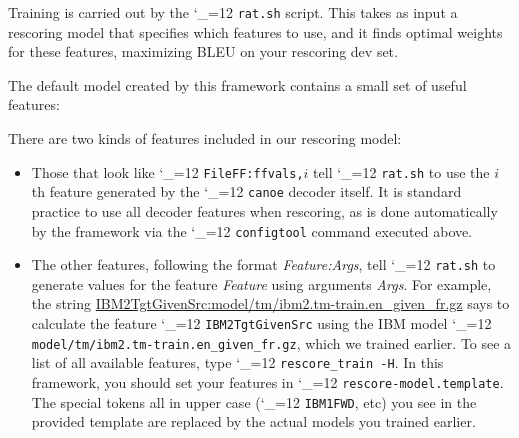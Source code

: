 \documentclass[11pt,letterpaper]{article}
\newcommand{\bs}{\textbackslash{}}
\def\code{\begingroup\catcode`\_=12 \codex}
\newcommand{\codex}[1]{\texttt{#1}\endgroup}
\begin{document}
Training is carried out by the \code{rat.sh} script. This takes as input a
rescoring model that specifies which features to use, and it finds optimal
weights for these features, maximizing BLEU on your rescoring dev set.

The default model created by this framework contains a small set of useful
features:
There are two kinds of features included in our rescoring model:
\begin{itemize}
\item Those that look like \code{FileFF:ffvals,}$i$ tell \code{rat.sh} to
use the $i$\/th feature generated by the \code{canoe} decoder itself. It is
standard practice to use all decoder features when rescoring, as is done
automatically by the framework via the \code{configtool} command executed
above.
\item The other features, following the format \emph{Feature:Args}, tell
\code{rat.sh} to generate values for the feature \emph{Feature} using
arguments \emph{Args}.  For example, the string
\url{IBM2TgtGivenSrc:model/tm/ibm2.tm-train.en_given_fr.gz} says to calculate
the feature \code{IBM2TgtGivenSrc} using the IBM model
\code{model/tm/ibm2.tm-train.en_given_fr.gz}, which we trained earlier. To
see a list of all available features, type \code{rescore_train -H}.  In this
framework, you should set your features in \code{rescore-model.template}.
The special tokens all in upper case (\code{IBM1FWD}, etc) you see in the
provided template are replaced by the actual models you trained earlier.
\end{itemize}
\end{document}
